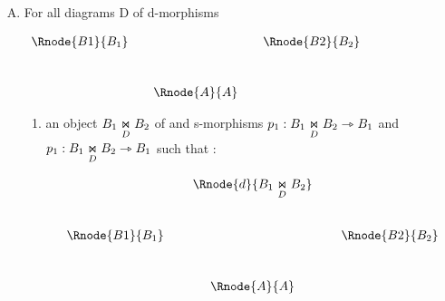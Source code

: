 \documentclass[10pt,a4paper]{scrartcl}
\begin{document}
\begin{enumerate} [A.,leftmargin=0.5cm]
\begin{enumerate}[label*=\arabic*]
\begin{center}
$
\setlength{\arraycolsep}{.25cm}
\begin{array}{ccc}
             & \Rnode{C}{C}&               \\ [0.6cm]
\Rnode{B1}{B_1}&             & \Rnode{B2}{B_2} \\ 
\end{array}
$
\end{center}
is
\begin{center}
$
\setlength{\arraycolsep}{.25cm}
\begin{array}{ccc}
\Rnode{B1}{B_1}&            & \Rnode{B2}{B_2} \\ [0.6cm]
             &\Rnode{A}{A}& 
\end{array}
$
\end{center}
\end{enumerate} %

\item 
For all diagrams D of d-morphisms 
	\begin{center}
$
\begin{array}{cp{0cm}cp{0cm}c}
\Rnode{B1}{B_1}& &            &  &\Rnode{B2}{B_2} \\ [1.0cm]
               & &\Rnode{A}{A}& &
\end{array}
$
\end{center}
\begin{enumerate}[label*=\arabic*]  

\item	
an object  $ \fibrex{B_1}{B_2}{D}$ of  and s-morphisms 
$p_1: \fibrex{B_1}{B_2}{D} \smorph B_1$ and  $p_1: \fibrex{B_1}{B_2}{D} \smorph B_1$ such that :

\begin{center}
\begin{displaymath}
\begin{array}{cp{0.1cm}cp{0.1cm} c}
            & &\Rnode{d}{\fibrex{B_1}{B_2}{D}}                  \\ [1.0cm]
\Rnode{B1}{B_1}& &                & & \Rnode{B2}{B_2}           \\ [1.0cm]
                   & &\Rnode{A}{A}& &
\end{array}
\end{displaymath}
 
\end{center}


\end{enumerate}
\end{enumerate}
\end{document}
